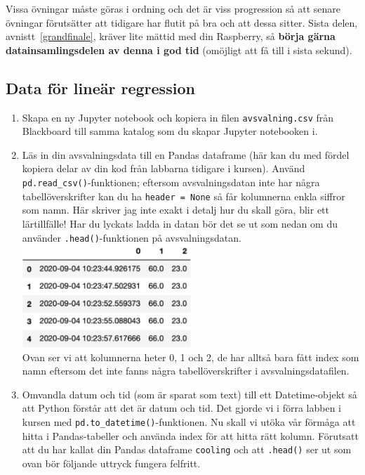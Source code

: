 \documentclass{article}
\begin{document}
Vissa övningar måste göras i ordning och det är viss progression så att senare övningar förutsätter att tidigare har flutit på bra och att dessa sitter. Sista delen, avnistt~\ref{grandfinale}, kräver lite mättid med din Raspberry, så \textbf{börja gärna datainsamlingsdelen av denna i god tid} (omöjligt att få till i sista sekund). 

\subsection{Data för lineär regression}
\begin{enumerate}
    \item Skapa en ny Jupyter notebook och kopiera in filen \texttt{avsvalning.csv} från Blackboard till samma katalog som du skapar Jupyter notebooken i. 
    \item Läs in din avsvalningsdata till en Pandas dataframe (här kan du med fördel kopiera delar av din kod från labbarna  tidigare i kursen). Använd \texttt{pd.read\_csv()}-funktionen; eftersom avsvalningsdatan inte har några tabellöverskrifter kan du ha \texttt{header = None} så får kolumnerna enkla siffror som namn. Här skriver jag inte exakt i detalj hur du skall göra, blir ett lärtillfälle! Har du lyckats ladda in datan bör det se ut som nedan om du använder \texttt{.head()}-funktionen på avsvalningsdatan.\\
    \includegraphics[width=0.5\textwidth]{figures/pandas1.png}\\
    Ovan ser vi att kolumnerna heter 0, 1 och 2, de har alltså bara fått index som namn eftersom det inte fanns några tabellöverskrifter i avsvalningsdatafilen.
    \item Omvandla datum och tid (som är sparat som text) till ett Datetime-objekt så att Python förstår att det är datum och tid. Det gjorde vi i förra labben i kursen med \texttt{pd.to\_datetime()}-funktionen. Nu skall vi utöka vår förmåga att hitta i Pandas-tabeller och använda index för att hitta rätt kolumn. Förutsatt att du har kallat din Pandas dataframe \texttt{cooling} och att \texttt{.head()} ser ut som ovan bör följande uttryck fungera felfritt. 

\end{enumerate}
\end{document}
